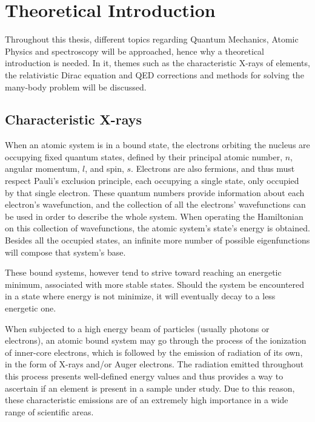 
%
\listoftodos


\chapter{Theoretical Introduction}\label{cha:introduction}
Throughout this thesis, different topics regarding Quantum Mechanics, Atomic Physics and spectroscopy will be approached, hence why a theoretical introduction is needed. In it, themes such as the characteristic X-rays of elements, the relativistic Dirac equation and \gls{QED} corrections and methods for solving the many-body problem will be discussed.


\section{Characteristic X-rays}


When an atomic system is in a bound state, the electrons orbiting the nucleus are occupying fixed quantum states, defined by their principal atomic number, $n$, angular momentum, $l$, and spin, $s$. Electrons are also fermions, and thus must respect Pauli's exclusion principle, each occupying a single state, only occupied by that single electron.
 These quantum numbers provide information about each electron's wavefunction, and the collection of all the electrons' wavefunctions can be used in order to describe the whole system. When operating the Hamiltonian on this collection of wavefunctions, the atomic system's state's energy is obtained.
Besides all the occupied states, an infinite more number of possible eigenfunctions will compose that system's base.


These bound systems, however tend to strive toward reaching an energetic minimum, associated with more stable states. Should the system be encountered in a state where energy is not minimize, it will eventually decay to a less energetic one.

When subjected to a high energy beam of particles (usually photons or electrons), an atomic bound system may go through the process of the ionization of inner-core electrons, which is followed by the emission of radiation of its own, in the form of X-rays and/or Auger electrons. The radiation emitted throughout this process presents well-defined energy values and thus provides a way to ascertain if an element is present in a sample under study. Due to this reason, these characteristic emissions are of an extremely high importance in a wide range of scientific areas.




